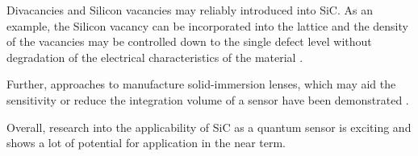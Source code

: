 Divacancies and Silicon vacancies may reliably introduced into SiC. As an example, the Silicon vacancy can be incorporated into the lattice and the density of the vacancies may be controlled down to the single defect level without degradation of the electrical characteristics of the material
\cite{Ohshima2018,PhysRevApplied.4.014009,Wang2019}
.

Further, approaches to manufacture solid-immersion lenses, which may aid the sensitivity or reduce the integration volume of a sensor have been demonstrated
\cite{Sardi2020}
.

Overall, research into the applicability of SiC as a quantum sensor is exciting and shows a lot of potential for application in the near term. 





